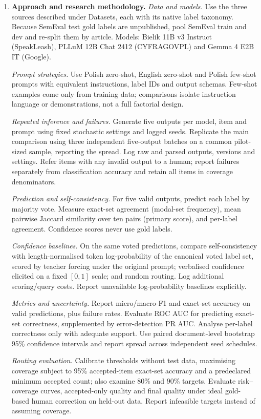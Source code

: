 \documentclass[11pt]{article}
\begin{document}
\begin{enumerate}
\item \textbf{Approach and research methodology.}
\textit{Data and models.}
Use the three sources described under Datasets, each with its native label taxonomy. Because SemEval test gold labels are unpublished, pool SemEval train and dev and re-split them by article. Models: Bielik 11B v3 Instruct (SpeakLeash), PLLuM 12B Chat 2412 (CYFRAGOVPL) and Gemma 4 E2B IT (Google).


\textit{Prompt strategies.}
Use Polish zero-shot, English zero-shot and Polish few-shot prompts with equivalent instructions, label IDs and output schemas. Few-shot examples come only from training data; comparisons isolate instruction language or demonstrations, not a full factorial design.

\textit{Repeated inference and failures.}
Generate five outputs per model, item and prompt using fixed stochastic settings and logged seeds. Replicate the main comparison using three independent five-output batches on a common pilot-sized sample, reporting the spread. Log raw and parsed outputs, versions and settings. Refer items with any invalid output to a human; report failures separately from classification accuracy and retain all items in coverage denominators.

\textit{Prediction and self-consistency.}
For five valid outputs, predict each label by majority vote. Measure exact-set agreement (modal-set frequency), mean pairwise Jaccard similarity over ten pairs (primary score), and per-label agreement. Confidence scores never use gold labels.

\textit{Confidence baselines.}
On the same voted predictions, compare self-consistency with length-normalised token log-probability of the canonical voted label set, scored by teacher forcing under the original prompt; verbalised confidence elicited on a fixed $[0,1]$ scale; and random routing. Log additional scoring/query costs. Report unavailable log-probability baselines explicitly.

\textit{Metrics and uncertainty.}
Report micro/macro-F1 and exact-set accuracy on valid predictions, plus failure rates. Evaluate ROC AUC for predicting exact-set correctness, supplemented by error-detection PR AUC. Analyse per-label correctness only with adequate support. Use paired document-level bootstrap 95\% confidence intervals and report spread across independent seed schedules.

\textit{Routing evaluation.}
Calibrate thresholds without test data, maximising coverage subject to 95\% accepted-item exact-set accuracy and a predeclared minimum accepted count; also examine 80\% and 90\% targets. Evaluate risk--coverage curves, accepted-only quality and final quality under ideal gold-based human correction on held-out data. Report infeasible targets instead of assuming coverage.


\end{enumerate}
\end{document}
